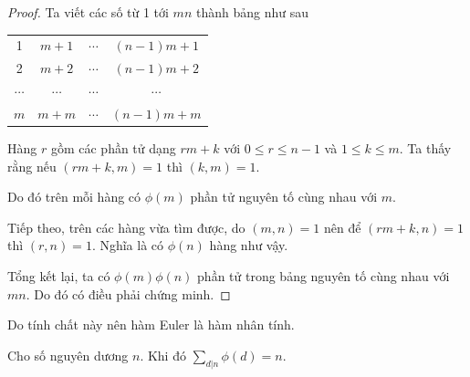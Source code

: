 \begin{proof}
    Ta viết các số từ 1 tới $mn$ thành bảng như sau

    \begin{table}
        \centering
        \begin{tabular}{c c c c}
            1 & $m+1$ & $\cdots$ & $(n-1)m + 1$ \\
            2 & $m+2$ & $\cdots$ & $(n-1)m + 2$ \\
            $\cdots$ & $\cdots$ & $\cdots$ & $\cdots$ \\
            $m$ & $m+m$ & $\cdots$ & $(n-1)m + m$
        \end{tabular}
    \end{table}
    
    Hàng $r$ gồm các phần tử dạng $r m + k$ với $0 \leqslant r \leqslant n-1$ và $1 \leqslant k \leqslant m$.  Ta thấy rằng nếu $(rm + k, m) = 1$ thì $(k, m) = 1$.

    Do đó trên mỗi hàng có $\phi(m)$ phần tử nguyên tố cùng nhau với $m$.

    Tiếp theo, trên các hàng vừa tìm được, do $(m, n) = 1$ nên để $(rm + k, n) = 1$ thì $(r, n) = 1$. Nghĩa là có $\phi(n)$ hàng như vậy.

    Tổng kết lại, ta có $\phi(m) \phi(n)$ phần tử trong bảng nguyên tố cùng nhau với $mn$. Do đó có điều phải chứng minh.
\end{proof}

Do tính chất này nên hàm Euler là hàm nhân tính.

\begin{remark}
    Cho số nguyên dương $n$. Khi đó $\displaystyle{\sum_{d | n} \phi(d) = n}$.
\end{remark}

